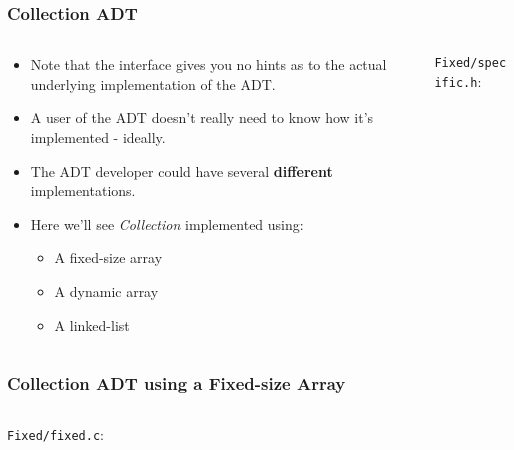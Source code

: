 \begin{frame}[fragile]
\frametitle{Collection ADT}
\begin{columns}[T]

\begin{column}{0.45\textwidth}
\begin{itemize}[<+->]
\item Note that the interface gives you no hints as to the actual underlying
implementation of the ADT.
\item A user of the ADT doesn't really need to know how it's
implemented - ideally.
\item The ADT developer could have several {\bf different} implementations.
\item Here we'll see {\em Collection} implemented using:
\begin{itemize}
\item A fixed-size array
\item A dynamic array
\item A linked-list
\end{itemize}
\end{itemize}
\end{column}

\pause
\begin{column}{0.45\textwidth}
\verb^Fixed/specific.h^:

\end{column}

\end{columns}
\end{frame}


\begin{frame}[fragile]
\frametitle{Collection ADT using a Fixed-size Array}
\begin{columns}[T]

\begin{column}{0.45\textwidth}
\verb^Fixed/fixed.c^:

\end{column}

\pause
\begin{column}{0.45\textwidth}

\end{column}

\end{columns}
\end{frame}

